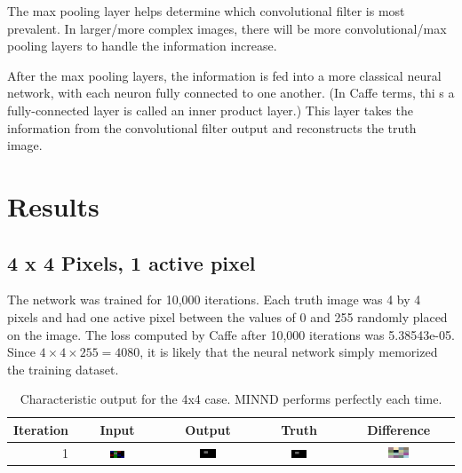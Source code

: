 \documentclass[twoside]{article}
\begin{document}
The max pooling layer helps determine which convolutional filter is most prevalent. In larger/more complex images, there will be more convolutional/max pooling layers to handle the information increase. \par After the max pooling layers, the information is fed into a more classical neural network, with each neuron fully connected to one another. (In Caffe terms, thi s a fully-connected layer is called an inner product layer.) This layer takes the information from the convolutional filter output and reconstructs the truth image.

\section{Results}

\subsection{4 x 4 Pixels, 1 active pixel}
The network was trained for 10,000 iterations. Each truth image was 4 by 4 pixels and had one active pixel between the values of 0 and 255 randomly placed on the image. The loss computed by Caffe after 10,000 iterations was 5.38543e-05. Since $4 \times 4 \times 255 = 4080$, it is likely that the neural network simply memorized the training dataset.

\begin{table}[H]
\begin{tabular}{| r | c | c | c | c |}
\hline
Iteration & Input & Output & Truth & Difference \\ \hline
1 & 
\includegraphics[width=0.2\textwidth]{images/4x4/1/in} &
\includegraphics[width=0.2\textwidth]{images/4x4/1/out} &
\includegraphics[width=0.2\textwidth]{images/4x4/1/truth} &
\includegraphics[width=0.2\textwidth]{images/4x4/1/dif} \\ \hline
\end{tabular}
\caption{Characteristic output for the 4x4 case. MINND performs perfectly each time.}
\end{table}
\end{document}

